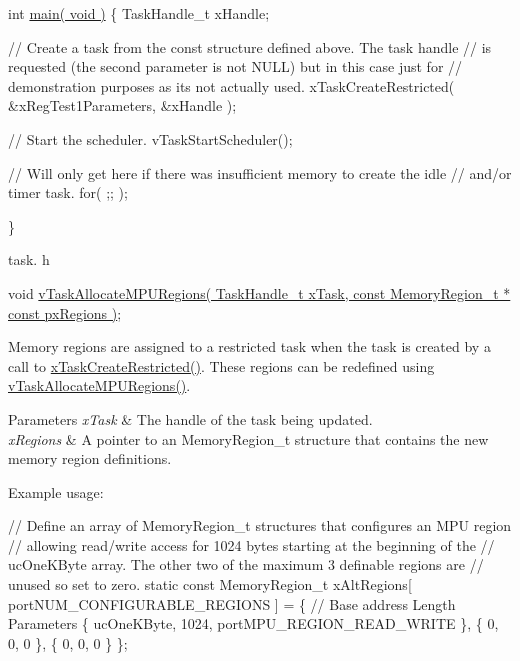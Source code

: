 \begin{DoxyPre}int \hyperlink{group__samples_ga840291bc02cba5474a4cb46a9b9566fe}{main( void )}
\{
TaskHandle\_t xHandle;
\begin{DoxyVerb}// Create a task from the const structure defined above.  The task handle
// is requested (the second parameter is not NULL) but in this case just for
// demonstration purposes as its not actually used.
xTaskCreateRestricted( &xRegTest1Parameters, &xHandle );

// Start the scheduler.
vTaskStartScheduler();

// Will only get here if there was insufficient memory to create the idle
// and/or timer task.
for( ;; );
\end{DoxyVerb}

\}
   \end{DoxyPre}


task. h 
\begin{DoxyPre}
 void \hyperlink{externals_2freertos_2include_2task_8h_ad889595baff9faf9efe02f3696825409}{vTaskAllocateMPURegions( TaskHandle\_t xTask, const MemoryRegion\_t * const pxRegions )};\end{DoxyPre}


Memory regions are assigned to a restricted task when the task is created by a call to \hyperlink{vendor_2ceedling_2plugins_2freertos_2src_2freertos_2include_2task_8h_a61b00cd623953f4f94fe794057d7f648}{x\+Task\+Create\+Restricted()}. These regions can be redefined using \hyperlink{externals_2freertos_2include_2task_8h_ad889595baff9faf9efe02f3696825409}{v\+Task\+Allocate\+M\+P\+U\+Regions()}.


\begin{DoxyParams}{Parameters}
{\em x\+Task} & The handle of the task being updated.\\
\hline
{\em x\+Regions} & A pointer to an Memory\+Region\+\_\+t structure that contains the new memory region definitions.\\
\hline
\end{DoxyParams}
Example usage\+: 
\begin{DoxyPre}
// Define an array of MemoryRegion\_t structures that configures an MPU region
// allowing read/write access for 1024 bytes starting at the beginning of the
// ucOneKByte array.  The other two of the maximum 3 definable regions are
// unused so set to zero.
static const MemoryRegion\_t xAltRegions[ portNUM\_CONFIGURABLE\_REGIONS ] =
\{
    // Base address     Length      Parameters
    \{ ucOneKByte,       1024,       portMPU\_REGION\_READ\_WRITE \},
    \{ 0,                0,          0 \},
    \{ 0,                0,          0 \}
\};\end{DoxyPre}



